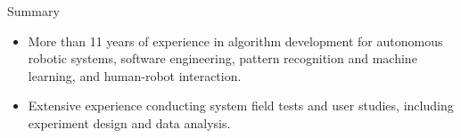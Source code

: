 \documentclass{resume} %
\begin{document}
%



\iffalse
\begin{rSection}{Objective}

  Searching for a part-time software developer position.

\end{rSection}
\fi



\iffalse
\begin{rSection}{Research Interests}

  Autonomous robotic systems, systems and controls, healthcare robotics,
  assistive technology, human-robot interaction, pattern recognition, and
  machine learning.

\end{rSection}
\fi




\begin{rSection}{Summary}


\begin{itemize}
\item More than 11 years of experience in algorithm development for autonomous
  robotic systems, software engineering, pattern recognition and machine
  learning, and human-robot interaction.
\item Extensive experience conducting system field tests and user studies,
  including experiment design and data analysis.
\end{itemize}

\end{rSection}
\end{document}
